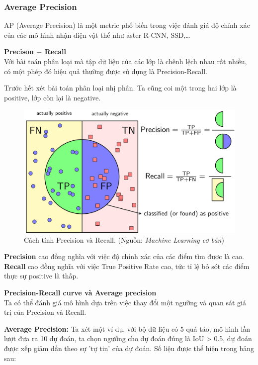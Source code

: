 \documentclass[a4paper, 12pt]{report}
\begin{document}
\subsubsection{Average Precision}
AP (Average Precision) là một metric phổ biến trong việc đánh giá độ chính xác của các mô hình nhận diện vật thể như aster R-CNN, SSD,\dots\par	
\textbf{Precison $-$ Recall}\\
Với bài toán phân loại mà tập dữ liệu của các lớp là chênh lệch nhau rất nhiều, có một phép đó hiệu quả thường được sử dụng là Precision-Recall.\par
Trước hết xét bài toán phân loại nhị phân. Ta cũng coi một trong hai lớp là positive, lớp còn lại là negative.\par
\begin{figure}[!h]
	\centering
	\includegraphics[width=0.7\linewidth]{Images/PR}
	\caption{Cách tính Precision và Recall. (Nguồn: \textit{Machine Learning cơ bản})}
	\label{fig:iou2}
\end{figure}
\textbf{Precision} cao đồng nghĩa với việc độ chính xác của các điểm tìm được là cao. \textbf{Recall} cao đồng nghĩa với việc True Positive Rate cao, tức tỉ lệ bỏ sót các điểm thực sự positive là thấp.\par
\textbf{Precision-Recall curve và Average precision}\\
Ta có thể đánh giá mô hình dựa trên việc thay đổi một ngưỡng và quan sát giá trị của Precision và Recall.\par
\textbf{Average Precision:} Ta xét một ví dụ, với bộ dữ liệu có 5 quả táo, mô hình lần lượt đưa ra 10 dự đoán, ta chọn ngưỡng cho dự đoán đúng là IoU > 0.5, dự đoán được xếp giảm dần theo sự 'tự tin' của dự đoán. Số liệu được thể hiện trong bảng sau: \par
\end{document}
